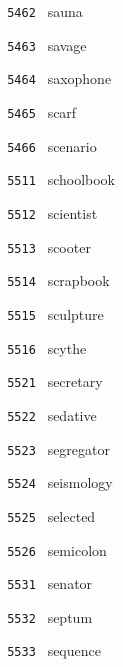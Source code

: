 \documentclass[11pt]{article}
\begin{document}
\begin{multicols}{6}
\noindent \texttt{ 5462 } \hspace{1mm} sauna  \par
\noindent \texttt{ 5463 } \hspace{1mm} savage  \par
\noindent \texttt{ 5464 } \hspace{1mm} saxophone  \par
\noindent \texttt{ 5465 } \hspace{1mm} scarf  \par
\noindent \texttt{ 5466 } \hspace{1mm} scenario  \par
\noindent \texttt{ 5511 } \hspace{1mm} schoolbook  \par
\noindent \texttt{ 5512 } \hspace{1mm} scientist  \par
\noindent \texttt{ 5513 } \hspace{1mm} scooter  \par
\noindent \texttt{ 5514 } \hspace{1mm} scrapbook  \par
\noindent \texttt{ 5515 } \hspace{1mm} sculpture  \par
\noindent \texttt{ 5516 } \hspace{1mm} scythe  \par
\noindent \texttt{ 5521 } \hspace{1mm} secretary  \par
\noindent \texttt{ 5522 } \hspace{1mm} sedative  \par
\noindent \texttt{ 5523 } \hspace{1mm} segregator  \par
\noindent \texttt{ 5524 } \hspace{1mm} seismology  \par
\noindent \texttt{ 5525 } \hspace{1mm} selected  \par
\noindent \texttt{ 5526 } \hspace{1mm} semicolon  \par
\noindent \texttt{ 5531 } \hspace{1mm} senator  \par
\noindent \texttt{ 5532 } \hspace{1mm} septum  \par
\noindent \texttt{ 5533 } \hspace{1mm} sequence  \par

\end{multicols}
\end{document}
